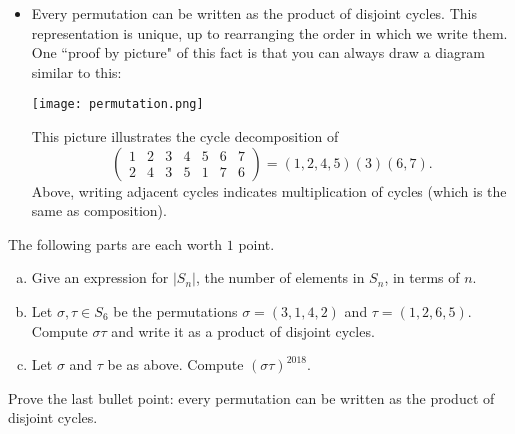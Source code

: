 \documentclass[10pt]{article}
\newif\ifpaper
\begin{document}
\begin{itemize}
\item Every permutation can be written as the product of disjoint cycles. This representation is unique, up to rearranging the order in which we write them. One ``proof by picture" of this fact is that you can always draw a diagram similar to this:
\begin{center}
\texttt{[image: permutation.png]}
\end{center}
This picture illustrates the cycle decomposition of 
\[\begin{pmatrix}1&2&3&4&5&6&7\\2&4&3&5&1&7&6\end{pmatrix}=(1,2,4,5)(3)(6,7).\]
Above, writing adjacent cycles indicates multiplication of cycles
(which is the same as composition).
\end{itemize}

\begin{problem}
    [3 points]
    The following parts are each worth $1$ point.
    \begin{enumerate}[(a)]
    \item Give an expression for $|S_n|$, the number of elements in $S_n$, in terms of $n$.
    \item Let $\sigma, \tau \in S_6$ be the permutations $\sigma = (3, 1, 4, 2)$ and $\tau = (1, 2, 6, 5)$. Compute $\sigma\tau$ and write it as a product of disjoint cycles.
    \item Let $\sigma$ and $\tau$ be as above. Compute $(\sigma\tau)^{2018}$.
    \end{enumerate}
\end{problem}

\ifpaper
\begin{tcolorbox}
\begin{enumerate}[(a)]
\item $n!$
\item $(3, 1) (6, 5, 4, 2)$
\item $(4,6)(2,5)$
\end{enumerate}
\end{tcolorbox}
\fi

\begin{problem}[2 points]
Prove the last bullet point:
every permutation can be written as the product of disjoint cycles.
\end{problem}

\ifpaper
\begin{tcolorbox}
Fix $n\in\mathbb N$, and let $x\in [n]$ be arbitrary.  Consider the numbers $x,\sigma(x),\sigma^2(x),\ldots, \sigma^n(x)$.  By Pigeonhole there exist $i<j$ such that $\sigma^i(x) = \sigma^j(x)$, and since $\sigma$ is a bijection, $\sigma^{j-i}(x) = x$.  Now write \[\sigma = (x,\sigma(x),\ldots, \sigma^{j-i-1}(x)) \sigma'\] where $\sigma'$ is the restriction of $\sigma$ to the remaining elements of $[n]$.  Finish by an inductive argument.
\end{tcolorbox}
\fi
\end{document}
